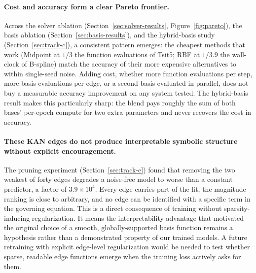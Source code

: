 \paragraph{Cost and accuracy form a clear Pareto frontier.} Across the
solver ablation (Section~\ref{sec:solver-results}, Figure~\ref{fig:pareto}),
the basis ablation (Section~\ref{sec:basis-results}), and the hybrid-basis
study (Section~\ref{sec:track-c}), a consistent pattern emerges: the
cheapest methods that work (Midpoint at $1/3$ the function evaluations of
Tsit5; RBF at $1/3.9$ the wall-clock of B-spline) match the accuracy of
their more expensive alternatives to within single-seed noise. Adding cost,
whether more function evaluations per step, more basis evaluations per
edge, or a second basis evaluated in parallel, does not buy a measurable
accuracy improvement on any system tested. The hybrid-basis result makes
this particularly sharp: the blend pays roughly the sum of both bases'
per-epoch compute for two extra parameters and never recovers the cost in
accuracy.

\paragraph{These KAN edges do not produce interpretable symbolic structure
without explicit encouragement.} The pruning experiment
(Section~\ref{sec:track-e}) found that removing the two weakest of forty edges
degrades a noise-free model to worse than a constant predictor, a factor of
$3.9\times10^4$. Every edge carries part of the fit, the magnitude ranking
is close to arbitrary, and no edge can be identified with a specific term in
the governing equation. This is a direct consequence of training without
sparsity-inducing regularization. It means the interpretability advantage
that motivated the original choice of a smooth, globally-supported basis
function remains a hypothesis rather than a demonstrated property of our
trained models. A future retraining with explicit edge-level regularization
would be needed to test whether sparse, readable edge functions emerge when
the training loss actively asks for them.
